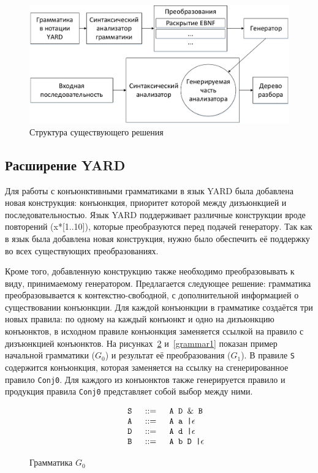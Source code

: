 \documentclass[14pt]{matmex-diploma-custom}
\begin{document}
\begin{figure}[h]
\centering
\includegraphics[width=15cm]{courseworkpictures/img2.pdf}
\caption{Структура существующего решения}
\label{project_structure}
\end{figure}

\subsection{Расширение YARD}
Для работы с конъюнктивными грамматиками в язык YARD была добавлена новая конструкция: конъюнкция, приоритет которой между дизъюнкцией и последовательностью. Язык YARD поддерживает различные конструкции вроде повторений (x*[1..10]), которые преобразуются перед подачей генератору. Так как в язык была добавлена новая конструкция, нужно было обеспечить её поддержку во всех существующих преобразованиях.

Кроме того, добавленную конструкцию также необходимо преобразовывать к виду, принимаемому генератором. Предлагается следующее решение: грамматика преобразовывается к контекстно-свободной, с дополнительной информацией о существовании конъюнкции. Для каждой конъюнкции в грамматике создаётся три новых правила: по одному на каждый конъюнкт и одно на дизъюнкцию конъюнктов, в исходном правиле конъюнкция заменяется ссылкой на правило с дизъюнкцией конъюнктов. На рисунках~\ref{grammar0} и~\ref{grammar1} показан пример начальной грамматики ($G_{0}$) и результат её преобразования ($G_{1}$). В правиле \verb|S| содержится конъюнкция, которая заменяется на ссылку на сгенерированное правило \verb|Conj0|. Для каждого из конъюнктов также генерируется правило и продукция правила \verb|Conj0| представляет собой выбор между ними.

\begin{figure}
$$
\begin{array}{crcl}
& \mbox{\texttt{ S }} &::=& \mbox{\texttt{ A D }} \& \mbox{\texttt{ B}} \\
& \mbox{\texttt{ A }} & ::=& \mbox{\texttt{ A a |}}  \epsilon \\
& \mbox{\texttt{ D }} & ::=& \mbox{\texttt{ A d |}}  \epsilon \\
& \mbox{\texttt{ B }} & ::=& \mbox{\texttt{ A b D |}}\epsilon \\
\end{array}
$$
\caption{Грамматика $G_{0}$}
\label{grammar0}
\end{figure}
\end{document}
